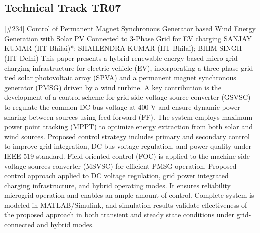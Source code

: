 \clearpage \subsection{Technical Track TR07}\nopagebreak {} \begin{abstract_online} {[\#234] Control of Permanent Magnet Synchronous Generator based Wind Energy Generation with Solar PV Connected to 3-Phase Grid for EV charging} {} {SANJAY KUMAR (IIT Bhilai)*; SHAILENDRA  KUMAR (IIT Bhilai); BHIM SINGH (IIT Delhi)} {} This paper presents a hybrid renewable energy-based micro-grid charging infrastructure for electric vehicle (EV), incorporating a three-phase grid-tied solar photovoltaic array (SPVA) and a permanent magnet synchronous generator (PMSG) driven by a wind turbine. A key contribution is the development of a control scheme for grid side voltage source converter (GSVSC) to regulate the common DC bus voltage at 400 V and ensure dynamic power sharing between sources using feed forward (FF). The system employs maximum power point tracking (MPPT) to optimize energy extraction from both solar and wind sources. Proposed control strategy includes primary and secondary control to improve grid integration, DC bus voltage regulation, and power quality under IEEE 519 standard. Field oriented control (FOC) is applied to the machine side voltage sources converter (MSVSC) for efficient PMSG operation. Proposed control approach applied to DC voltage regulation, grid power integrated charging infrastructure, and hybrid operating modes. It ensures reliability microgrid operation and enables an ample amount of control. Complete system is modeled in MATLAB/Simulink, and simulation results validate effectiveness of the proposed approach in both transient and steady state conditions under grid-connected and hybrid modes. \end{abstract_online} 
